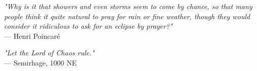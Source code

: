 \begin{flushright}
\emph{"Why is it that showers and even storms seem to come by chance, so that many people think it quite natural to pray for rain or fine weather, though they would consider it ridiculous to ask for an eclipse by prayer?"}\\
 — Henri Poincaré
\end{flushright}
\vspace{2em}
\begin{flushright}
\emph{"Let the Lord of Chaos rule."}\\
 — Semirhage, 1000 NE
\end{flushright}